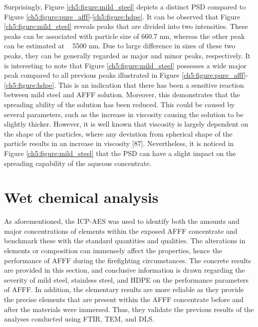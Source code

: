 \documentclass[12pt]{report}
\begin{document}
Surprisingly, Figure \ref{ch5:figure:mild_steel} depicts a distinct PSD compared to Figure \ref{ch5:figure:pure_afff}-\ref{ch5:figure:hdpe}. It can be observed that Figure \ref{ch5:figure:mild_steel} reveals peaks that are divided into two intensities. These peaks can be associated with particle size of 660.7 nm, whereas the other peak can be estimated at ~ 5500 nm.  Due to large difference in sizes of these two peaks, they can be generally regarded as major and minor peaks, respectively.  It is interesting to note that Figure \ref{ch5:figure:mild_steel} possesses a wide major peak compared to all previous peaks illustrated in Figure \ref{ch5:figure:pure_afff}-\ref{ch5:figure:hdpe}. This is an indication that there has been a sensitive reaction between mild steel and AFFF solution. Moreover, this demonstrates that the spreading ability of the solution has been reduced. This could be caused by several parameters, such as the increase in viscosity causing the solution to be slightly thicker. However, it is well known that viscosity is largely dependent on the shape of the particles, where any deviation from spherical shape of the particle results in an increase in viscosity [87]. Nevertheless, it is noticed in Figure \ref{ch5:figure:mild_steel} that the PSD can have a slight impact on the spreading capability of the aqueous concentrate.

\section{Wet chemical analysis}
As aforementioned, the ICP-AES was used to identify both the amounts and major concentrations of elements within the exposed AFFF concentrate and benchmark these with the standard quantities and qualities. The alterations in elements or composition can immensely affect the properties, hence the performance of AFFF during the firefighting circumstances. The concrete results are provided in this section, and conclusive information is drawn regarding the severity of mild steel, stainless steel, and HDPE on the performance parameters of AFFF. In addition, the elementary results are more reliable as they provide the precise elements that are present within the AFFF concentrate before and after the materials were immersed. Thus, they validate the previous results of the analyses conducted using FTIR, TEM, and DLS.
\end{document}
